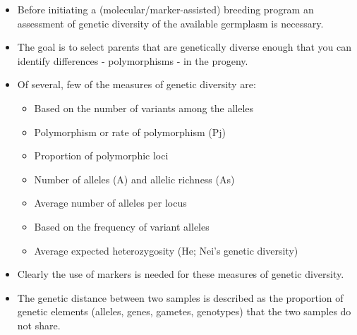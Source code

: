 \documentclass[
  ignorenonframetext,
  aspectratio=169]{beamer}
\begin{document}
\begin{frame}{}
\protect\hypertarget{section}{}
\begin{itemize}
\item
  Before initiating a (molecular/marker-assisted) breeding program an
  assessment of genetic diversity of the available germplasm is
  necessary.
\item
  The goal is to select parents that are genetically diverse enough that
  you can identify differences - polymorphisms - in the progeny.
\item
  Of several, few of the measures of genetic diversity are:

  \begin{itemize}
  \footnotesize
  \item Based on the number of variants among the alleles
  \item Polymorphism or rate of polymorphism (Pj)
  \item Proportion of polymorphic loci
  \item Number of alleles (A) and allelic richness (As)
  \item Average number of alleles per locus
  \item Based on the frequency of variant alleles
  \item Average expected heterozygosity (He; Nei’s genetic diversity)
  \end{itemize}
\item
  Clearly the use of markers is needed for these measures of genetic
  diversity.
\item
  The genetic distance between two samples is described as the
  proportion of genetic elements (alleles, genes, gametes, genotypes)
  that the two samples do not share.
\end{itemize}
\end{frame}
\end{document}
